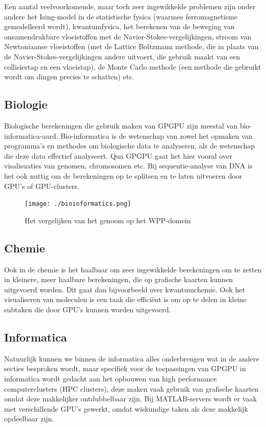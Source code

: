 \documentclass[11pt, a4paper]{article}
\begin{document}
Een aantal veelvoorkomende, maar toch zeer ingewikkelde problemen zijn onder andere het Ising-model\cite{ising} in de statistische fysica (waarmee ferromagnetisme gemodelleerd wordt), kwantumfysica, het berekenen van de beweging van onsamendrukbare vloeistoffen\cite{giancoli} met de Navier-Stokes-vergelijkingen, stroom van Newtoniaanse vloeistoffen (met de Lattice Boltzmann methode, die in plaats van de Navier-Stokes-vergelijkingen andere uitvoert, die gebruik maakt van een collisiestap en een vloeistap), de Monte Carlo methode\cite{montecarlo} (een methode die gebruikt wordt om dingen precies te schatten) etc.

\subsection{Biologie}

Biologische berekeningen die gebruik maken van GPGPU zijn meestal van bio-informatica-aard. Bio-informatica is de wetenschap van zowel het opmaken van programma's en methodes om biologische data te analyseren, als de wetenschap die deze data effectief analyseert. Qua GPGPU gaat het hier vooral over visalisuaties van genomen, chromosomen etc. Bij sequentie-analyse van DNA is het ook nuttig om de berekeningen op te splitsen en te laten uitvoeren door GPU's of GPU-clusters.

\begin{figure}[H]
	\centering
	\texttt{[image: ./bioinformatics.png]}
	\caption{Het vergelijken van het genoom op het WPP-domein}	
\end{figure}

\subsection{Chemie}

Ook in de chemie is het haalbaar om zeer ingewikkelde berekeningen om te zetten in kleinere, meer haalbare berekeningen, die op grafische kaarten kunnen uitgevoerd worden. Dit gaat dan bijvoorbeeld over kwantumchemie. Ook het visualiseren van moleculen is een taak die effici\"ent is om op te delen in kleine subtaken die door GPU's kunnen worden uitgevoerd.

\subsection{Informatica}

Natuurlijk kunnen we binnen de informatica alles onderbrengen wat in de andere secties besproken wordt, maar specifiek voor de toepassingen van GPGPU in informatica wordt gedacht aan het opbouwen van high performance computerclusters (HPC clusters\cite{HPCClusters}), deze maken vaak gebruik van grafische kaarten omdat deze makkelijker ontdubbelbaar zijn. Bij MATLAB-servers wordt er vaak met verschillende GPU's gewerkt, omdat wiskundige taken als deze makkelijk opdeelbaar zijn.
\end{document}
